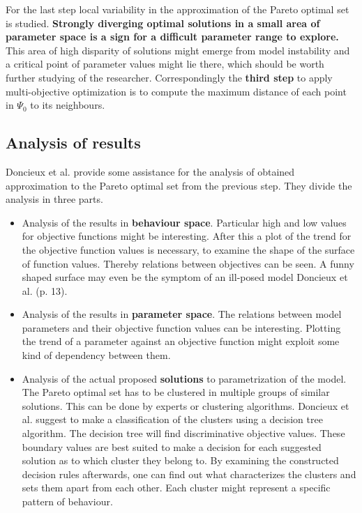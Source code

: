 \documentclass[12pt,twoside]{article}
\theoremstyle{plain}
\theoremstyle{definition}
\theoremstyle{remark}
\begin{document}
For the last step local variability in the approximation of the Pareto optimal set is studied. \textbf{Strongly diverging optimal solutions in a small area of parameter space is a sign for a difficult parameter range to explore.}
This area of high disparity of solutions might emerge from model instability and a critical point of parameter values might lie there, which should be worth further studying of the researcher.
Correspondingly the \textbf{third step} to apply multi-objective optimization is to compute the maximum distance of each point in $\Psi_0$ to its neighbours.
\subsection{Analysis of results}
Doncieux et al. provide some assistance for the analysis of obtained approximation to the Pareto optimal set from the previous step. They divide the analysis in three parts.
\begin{itemize}
	\item Analysis of the results in \textbf{behaviour space}. Particular high and low values for objective functions might be interesting. After this a plot of the trend for the objective function values is necessary, to examine the shape of the surface of function values. Thereby relations between objectives can be seen. A funny shaped surface \glqq may even be the symptom of an ill-posed model\grqq{} Doncieux et al. \cite{doncieux2015multi} (p. 13).
	\item Analysis of the results in \textbf{parameter space}. The relations between model parameters and their objective function values can be interesting. Plotting the trend of a parameter against an objective function might exploit some kind of dependency between them.
	\item Analysis of the actual proposed \textbf{solutions} to parametrization of the model. The Pareto optimal set has to be clustered in multiple groups of similar solutions. This can be done by experts or clustering algorithms.
	Doncieux et al. suggest to make a classification of the clusters using a decision tree algorithm. The decision tree will find discriminative objective values. These boundary values are best suited to make a decision for each suggested solution as to which cluster they belong to.
	By examining the constructed decision rules afterwards, one can find out what characterizes the clusters and sets them apart from each other. Each cluster might represent a specific pattern of behaviour.
\end{itemize}
\end{document}
